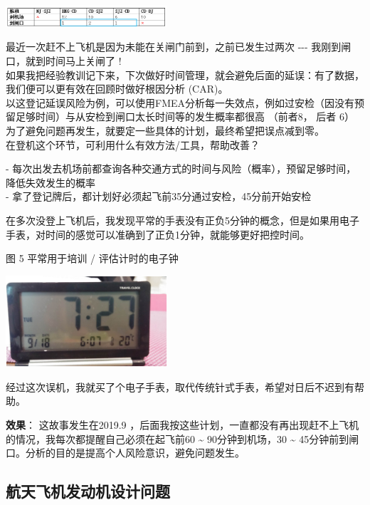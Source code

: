 
\includegraphics[width=6cm]{风险与机会41.png}

最近一次赶不上飞机是因为未能在关闸门前到，之前已发生过两次 -\/-\/-
我刚到闸口，就到时间马上关闸了 !\\
如果我把经验教训记下来，下次做好时间管理，就会避免后面的延误：有了数据，我们便可以更有效在回顾时做好根因分析
(CAR)。\\
以这登记延误风险为例，可以使用FMEA分析每一失效点，例如过安检（因没有预留足够时间）与从安检到闸口太长时间等的发生概率都很高
（前者8， 后者 6）\\
为了避免问题再发生，就要定一些具体的计划，最终希望把误点减到零。\\
在登机这个环节，可利用什么有效方法/工具，帮助改善？

-
每次出发去机场前都查询各种交通方式的时间与风险（概率），预留足够时间，降低失效发生的概率\\
- 拿了登记牌后，都计划好必须起飞前35分通过安检，45分前开始安检

在多次没登上飞机后，我发现平常的手表没有正负5分钟的概念，但是如果用电子手表，对时间的感觉可以准确到了正负1分钟，就能够更好把控时间。

图 5 平常用于培训 / 评估计时的电子钟


\includegraphics[width=6cm]{风险与机会5_闹钟.png}

经过这次误机，我就买了个电子手表，取代传统针式手表，希望对日后不迟到有帮助。

\textbf{效果}： 这故事发生在2019.9
，后面我按这些计划，一直都没有再出现赶不上飞机的情况，我每次都提醒自己必须在起飞前60
\textasciitilde{} 90分钟到机场，30 \textasciitilde{}
45分钟前到闸口。分析的目的是提高个人风险意识，避免问题发生。

\hypertarget{ux529fux80fdux6027ux5206ux7ec4ux5e2eux52a9ux56e2ux961fux6210ux957fux5b9eux4f8b}{%
\subsection{航天飞机发动机设计问题}\label{ux529fux80fdux6027ux5206ux7ec4ux5e2eux52a9ux56e2ux961fux6210ux957fux5b9eux4f8b}}

